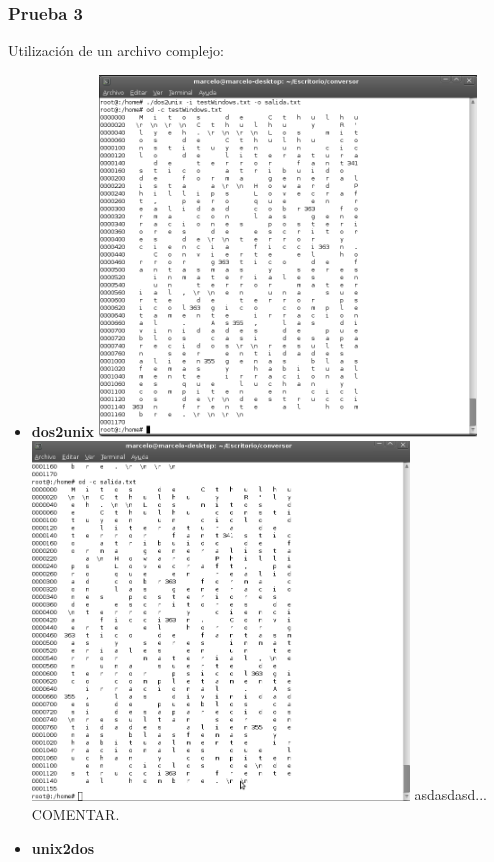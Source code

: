 \documentclass[a4paper,10pt]{article}
\begin{document}
    \subsubsection{Prueba 3}
    Utilizaci\'on de un archivo complejo:
      \begin{itemize}
      \item \textbf{dos2unix}
      \newline
      \includegraphics[width=10cm, viewport=0 0 844 808]{../Informe/Imagenes/prueba3-archivo-dos2unix1.png}
      \newline
      \includegraphics[width=10cm, viewport=0 0 839 798]{../Informe/Imagenes/prueba3-archivo-dos2unix2.png}
      \newline
      asdasdasd... COMENTAR.
      \item \textbf{unix2dos}

\end{itemize}
\end{document}
